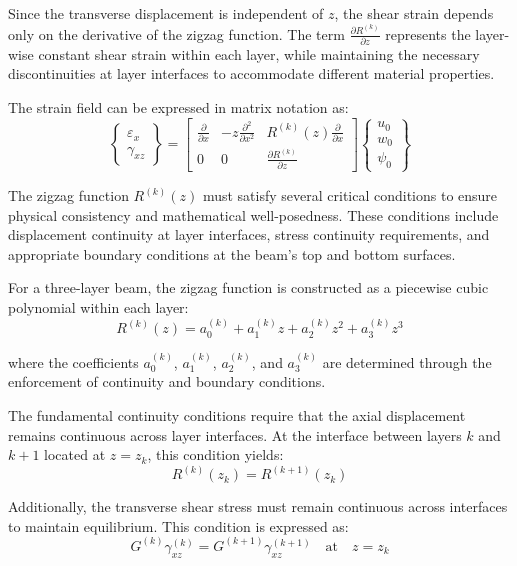 \documentclass[12pt,a4paper]{report}
\begin{document}
Since the transverse displacement is independent of $z$, the shear strain depends only on the derivative of the zigzag function. The term 
$\frac{\partial R^{(k)}}{\partial z}$ represents the layer-wise constant shear strain within each layer, while maintaining the necessary discontinuities at layer interfaces to accommodate different material properties.

The strain field can be expressed in matrix notation as:
\begin{equation}
\begin{Bmatrix} \varepsilon_x \\ \gamma_{xz} \end{Bmatrix} =
\begin{bmatrix} 
\frac{\partial}{\partial x} & -z \frac{\partial^2}{\partial x^2} & R^{(k)}(z) \frac{\partial}{\partial x} \\
0 & 0 & \frac{\partial R^{(k)}}{\partial z} 
\end{bmatrix}
\begin{Bmatrix} u_0 \\ w_0 \\ \psi_0 \end{Bmatrix}
\end{equation}


The zigzag function $R^{(k)}(z)$ must satisfy several critical conditions to ensure physical consistency and mathematical well-posedness. These conditions include displacement continuity at layer interfaces, stress continuity requirements, and appropriate boundary conditions at the beam's top and bottom surfaces.

For a three-layer beam, the zigzag function is constructed as a piecewise cubic polynomial within each layer:
\begin{equation}
R^{(k)}(z) = a_0^{(k)} + a_1^{(k)} z + a_2^{(k)} z^2 + a_3^{(k)} z^3
\end{equation}

where the coefficients $a_0^{(k)}$, $a_1^{(k)}$, $a_2^{(k)}$, and $a_3^{(k)}$ are determined through the enforcement of continuity and boundary conditions.

The fundamental continuity conditions require that the axial displacement remains continuous across layer interfaces. At the interface between layers $k$ and $k+1$ located at $z = z_k$, this condition yields:
\begin{equation}
R^{(k)}(z_k) = R^{(k+1)}(z_k)
\end{equation}

Additionally, the transverse shear stress must remain continuous across interfaces to maintain equilibrium. This condition is expressed as:
\begin{equation}
G^{(k)} \gamma_{xz}^{(k)} = G^{(k+1)} \gamma_{xz}^{(k+1)} \quad \text{at} \quad z = z_k
\end{equation}
\end{document}
